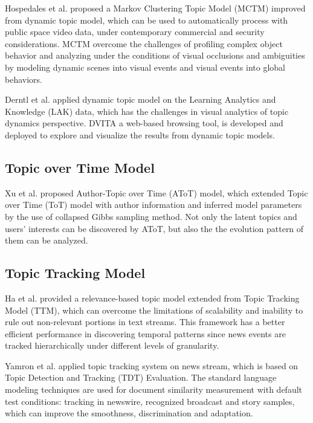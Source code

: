 Hospedales et al. \cite{hospedales2012video} proposed a Markov Clustering Topic Model (MCTM) improved from dynamic topic model, which can be used to automatically process with public space video data, under contemporary commercial and security considerations. MCTM overcome the challenges of profiling complex object behavior and analyzing under the conditions of visual occlusions and ambiguities by modeling dynamic scenes into visual events and visual events into global behaviors.

Derntl et al. \cite{derntl2013dynamic} applied dynamic topic model on the Learning Analytics and Knowledge (LAK) data, which has the challenges in visual analytics of topic dynamics perspective. DVITA a web-based browsing tool, is developed and deployed to explore and visualize the results from dynamic topic models. 


\subsection{Topic over Time Model}
\label{subsec:totApplication}

Xu et al. \cite{xu2014author} proposed Author-Topic over Time (AToT) model, which extended Topic over Time (ToT) model with author information and inferred model parameters by the use of collapsed Gibbs sampling method. Not only the latent topics and users’ interests can be discovered by AToT, but also the the evolution pattern of them can be analyzed.

\subsection{Topic Tracking Model}
\label{subsec:ttmApplication}

Ha et al. \cite{ha2009relevance} provided a relevance-based topic model extended from Topic Tracking Model (TTM), which can overcome the limitations of scalability and inability to rule out non-relevant portions in text streams. This framework has a better efficient performance in discovering temporal patterns  since news events are tracked hierarchically under different levels of granularity.

Yamron et al. \cite{yamron1999topic} applied topic tracking system on news stream, which is based on Topic Detection and Tracking (TDT) Evaluation. The standard language modeling techniques are used for document similarity measurement with default test conditions: tracking in newswire, recognized broadcast and story samples, which can improve the smoothness, discrimination and adaptation.

